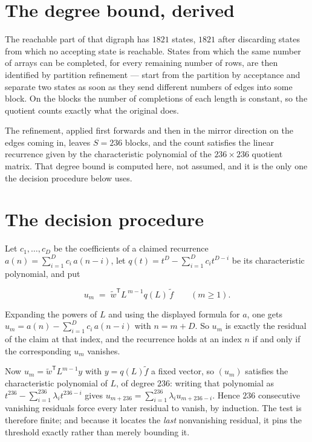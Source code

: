\documentclass[11pt]{article}
\theoremstyle{definition}
\begin{document}
\section{The degree bound, derived}

The reachable part of that digraph has $1821$ states, $1821$ after discarding states from which no accepting state is reachable. States from which the same number of arrays can be completed, for every remaining number of rows, are then identified by partition refinement --- start from the partition by acceptance and separate two states as soon as they send different numbers of edges into some block. On the blocks the number of completions of each length is constant, so the quotient counts exactly what the original does.

The refinement, applied first forwards and then in the mirror direction on the edges coming in, leaves $S = 236$ blocks, and the count satisfies the linear recurrence given by the characteristic polynomial of the $236 \times 236$ quotient matrix. That degree bound is computed here, not assumed, and it is the only one the decision procedure below uses.

\section{The decision procedure}

Let $c_1,\dots,c_D$ be the coefficients of a claimed recurrence $a(n) = \sum_{i=1}^{D} c_i\,a(n-i)$, let $q(t) = t^{D} - \sum_{i=1}^{D} c_i t^{D-i}$ be its characteristic polynomial, and put

\[u_m \;=\; \tilde w^{\mathsf T} L^{\,m-1} q(L)\,\tilde f \qquad (m \ge 1).\]

Expanding the powers of $L$ and using the displayed formula for $a$, one gets $u_m = a(n) - \sum_{i=1}^{D} c_i\,a(n-i)$ with $n = m + D$. So $u_m$ is exactly the residual of the claim at that index, and the recurrence holds at an index $n$ if and only if the corresponding $u_m$ vanishes.

Now $u_m = \tilde w^{\mathsf T} L^{m-1} y$ with $y = q(L)\tilde f$ a fixed vector, so $(u_m)$ satisfies the characteristic polynomial of $L$, of degree $236$: writing that polynomial as $t^{236} - \sum_{i=1}^{236} \lambda_i t^{236-i}$ gives $u_{m+236} = \sum_{i=1}^{236} \lambda_i u_{m+236-i}$. Hence $236$ consecutive vanishing residuals force every later residual to vanish, by induction. The test is therefore finite; and because it locates the {\itshape last} nonvanishing residual, it pins the threshold exactly rather than merely bounding it.
\end{document}
